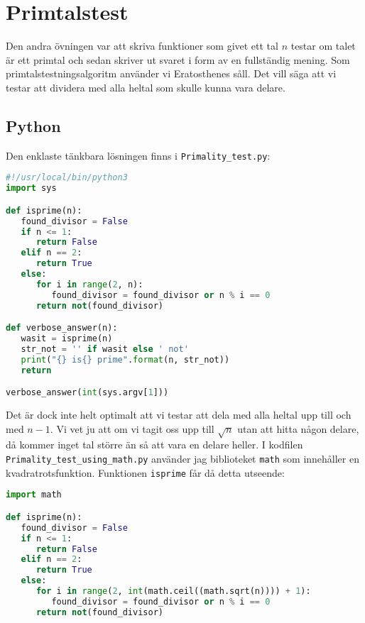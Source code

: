 \documentclass[10pt, twoside,a4paper]{article}
\begin{document}
\newpage
\section{Primtalstest}
Den andra övningen var att skriva funktioner som givet ett tal $n$ testar om talet är ett primtal och sedan skriver ut svaret i form av en fullständig mening. Som primtalstestningsalgoritm använder vi Eratosthenes såll. Det vill säga att vi testar att dividera med alla heltal som skulle kunna vara delare.

\subsection{Python}
Den enklaste tänkbara lösningen finns i \verb+Primality_test.py+:
\begin{lstlisting}[language=python]
#!/usr/local/bin/python3
import sys

def isprime(n):
   found_divisor = False
   if n <= 1:
      return False
   elif n == 2:
      return True
   else:
      for i in range(2, n):
         found_divisor = found_divisor or n % i == 0
      return not(found_divisor)

def verbose_answer(n):
   wasit = isprime(n)
   str_not = '' if wasit else ' not' 
   print("{} is{} prime".format(n, str_not))
   return

verbose_answer(int(sys.argv[1]))
\end{lstlisting}
Det är dock inte helt optimalt att vi testar att dela med alla heltal upp till och med $n-1$. Vi vet ju att om vi tagit oss upp till $\sqrt{n}$ utan att hitta någon delare, då kommer inget tal större än så att vara en delare heller. I kodfilen \verb+Primality_test_using_math.py+ använder jag biblioteket \verb+math+ som innehåller en kvadratrotsfunktion. Funktionen \verb+isprime+ får då detta utseende:
\begin{lstlisting}[language=python]
import math

def isprime(n):
   found_divisor = False
   if n <= 1:
      return False
   elif n == 2:
      return True
   else:
      for i in range(2, int(math.ceil((math.sqrt(n)))) + 1):
         found_divisor = found_divisor or n % i == 0
      return not(found_divisor)
\end{lstlisting}

\newpage
\end{document}
